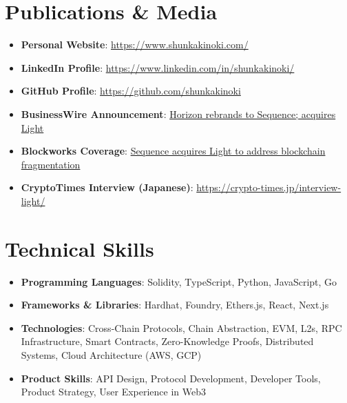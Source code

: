 \documentclass[letterpaper,11pt]{article}
\newcommand{\resumeItem}[2]{
  \item\small{
    \textbf{#1}{: #2 \vspace{-2pt}}
  }
}
\newcommand{\resumeSubHeadingListStart}{\begin{itemize}[leftmargin=*]}
\newcommand{\resumeSubHeadingListEnd}{\end{itemize}}
\begin{document}
\section{Publications \& Media}
  \resumeSubHeadingListStart
    \resumeItem{Personal Website}{\href{https://www.shunkakinoki.com/}{https://www.shunkakinoki.com/}}
    \resumeItem{LinkedIn Profile}{\href{https://www.linkedin.com/in/shunkakinoki/}{https://www.linkedin.com/in/shunkakinoki/}}
    \resumeItem{GitHub Profile}{\href{https://github.com/shunkakinoki}{https://github.com/shunkakinoki}}
    \resumeItem{BusinessWire Announcement}{\href{https://www.businesswire.com/news/home/20250408247816/en/Horizon-rebrands-to-Sequence-acquires-Light-to-unify-the-EVM-ecosystem-of-blockchains}{Horizon rebrands to Sequence; acquires Light}}
    \resumeItem{Blockworks Coverage}{\href{https://blockworks.co/news/exclusive-horizon-blockchain-games-sequence-rebrand}{Sequence acquires Light to address blockchain fragmentation}}
    \resumeItem{CryptoTimes Interview (Japanese)}{\href{https://crypto-times.jp/interview-light/}{https://crypto-times.jp/interview-light/}}
  \resumeSubHeadingListEnd

\section{Technical Skills}
  \resumeSubHeadingListStart
    \resumeItem{Programming Languages}{Solidity, TypeScript, Python, JavaScript, Go}
    \resumeItem{Frameworks \& Libraries}{Hardhat, Foundry, Ethers.js, React, Next.js}
    \resumeItem{Technologies}{Cross-Chain Protocols, Chain Abstraction, EVM, L2s, RPC Infrastructure, Smart Contracts, Zero-Knowledge Proofs, Distributed Systems, Cloud Architecture (AWS, GCP)}
    \resumeItem{Product Skills}{API Design, Protocol Development, Developer Tools, Product Strategy, User Experience in Web3}
  \resumeSubHeadingListEnd
\end{document}
